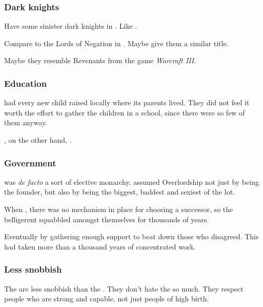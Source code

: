 \subsubsection{Dark knights}
Have some sinister dark knights in \Mystraacht. Like . 

Compare to the Lords of Negation in \FLuneNoire. Maybe give them a similar title. 

Maybe they resemble Revenants from the game \emph{Warcraft III}. 





\subsubsection{Education}
\Mystraacht{} had every new child raised locally where its parents lived. 
They did not feel it worth the effort to gather the children in a school, since there were so few of them anyway. 

\CiriathSepher, on the other hand, . 





\subsubsection{Government}
\Mystraacht{} was \emph{de facto} a sort of elective monarchy. 
\Zachirah{} assumed Overlordship not just by being the founder, but also by being the biggest, baddest and sexiest of the lot. 

When , there was no mechanism in place for choosing a successor, so the belligerent \Mystraacht{} squabbled amongst themselves for thousands of years. 

Eventually  by gathering enough support to beat down those who disagreed. 
This had taken more than a thousand years of concentrated work. 





\subsubsection{Less snobbish}
The \Mystraacht{} are less snobbish than the \KiriathSepher. 
They don't hate the \ashenblooded{} so much. 
They respect people who are strong and capable, not just people of high birth. 






